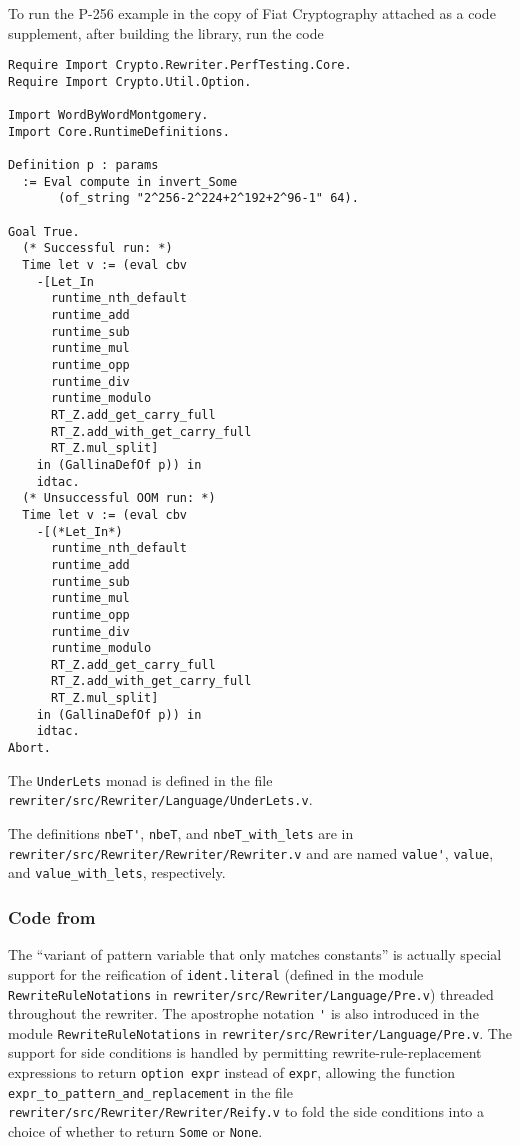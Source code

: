 \documentclass[sigplan,10pt,review,anonymous]{acmart}\settopmatter{printfolios=true,printccs=false,printacmref=false}
\begin{document}
To run the P-256 example in the copy of Fiat Cryptography attached as a code supplement, after building the library, run the code
\begin{verbatim}
Require Import Crypto.Rewriter.PerfTesting.Core.
Require Import Crypto.Util.Option.

Import WordByWordMontgomery.
Import Core.RuntimeDefinitions.

Definition p : params
  := Eval compute in invert_Some
       (of_string "2^256-2^224+2^192+2^96-1" 64).

Goal True.
  (* Successful run: *)
  Time let v := (eval cbv
    -[Let_In
      runtime_nth_default
      runtime_add
      runtime_sub
      runtime_mul
      runtime_opp
      runtime_div
      runtime_modulo
      RT_Z.add_get_carry_full
      RT_Z.add_with_get_carry_full
      RT_Z.mul_split]
    in (GallinaDefOf p)) in
    idtac.
  (* Unsuccessful OOM run: *)
  Time let v := (eval cbv
    -[(*Let_In*)
      runtime_nth_default
      runtime_add
      runtime_sub
      runtime_mul
      runtime_opp
      runtime_div
      runtime_modulo
      RT_Z.add_get_carry_full
      RT_Z.add_with_get_carry_full
      RT_Z.mul_split]
    in (GallinaDefOf p)) in
    idtac.
Abort.
\end{verbatim}

The \verb|UnderLets| monad is defined in the file \texttt{rewriter/src/Rewriter/Language/UnderLets.v}.

The definitions \verb|nbeT'|, \verb|nbeT|, and \verb|nbeT_with_lets| are in \texttt{rewriter/src/Rewriter/Rewriter/Rewriter.v} and are named \verb|value'|, \verb|value|, and \verb|value_with_lets|, respectively.

\subsubsection{Code from }

The ``variant of pattern variable that only matches constants'' is actually special support for the reification of \verb|ident.literal| (defined in the module \verb|RewriteRuleNotations| in \texttt{rewriter/src/Rewriter/Language/Pre.v}) threaded throughout the rewriter.
The apostrophe notation \verb|'| is also introduced in the module \verb|RewriteRuleNotations| in \texttt{rewriter/src/Rewriter/Language/Pre.v}.
The support for side conditions is handled by permitting rewrite-rule-replacement expressions to return \verb|option expr| instead of \verb|expr|, allowing the function \verb|expr_to_pattern_and_replacement| in the file \texttt{rewriter/src/Rewriter/Rewriter/Reify.v} to fold the side conditions into a choice of whether to return \verb|Some| or \verb|None|.
\end{document}
